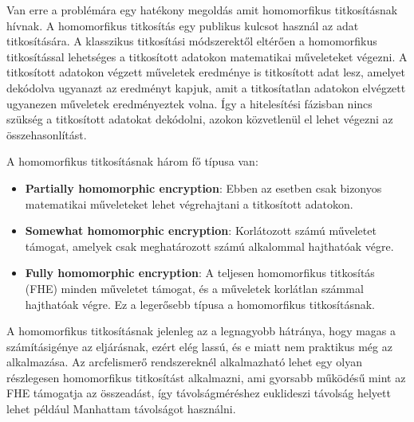Van erre a problémára egy hatékony megoldás amit homomorfikus titkosításnak hívnak. A homomorfikus titkosítás egy publikus kulcsot használ az adat titkosítására. A klasszikus titkosítási módszerektől eltérően a homomorfikus titkosítással lehetséges a titkosított adatokon matematikai műveleteket végezni. A titkosított adatokon végzett műveletek eredménye is titkosított adat lesz, amelyet dekódolva ugyanazt az eredményt kapjuk, amit a titkosítatlan adatokon elvégzett ugyanezen műveletek eredményeztek volna. Így a hitelesítési fázisban nincs szükség a titkosított adatokat dekódolni, azokon közvetlenül el lehet végezni az összehasonlítást. 

A homomorfikus titkosításnak három fő típusa van:

\begin{itemize}
	\item \textbf{Partially homomorphic encryption}: Ebben az esetben csak bizonyos matematikai műveleteket lehet végrehajtani a titkosított adatokon.
	\item \textbf{Somewhat homomorphic encryption}: Korlátozott számú műveletet támogat, amelyek csak meghatározott számú alkalommal hajthatóak végre.
	\item \textbf{Fully homomorphic encryption}: A teljesen homomorfikus titkosítás (FHE) minden műveletet támogat, és a műveletek korlátlan számmal hajthatóak végre. Ez a legerősebb típusa a homomorfikus titkosításnak. 
\end{itemize}

A homomorfikus titkosításnak jelenleg az a legnagyobb hátránya, hogy magas a számításigénye az eljárásnak, ezért elég lassú, és e miatt nem praktikus még az alkalmazása. Az arcfelismerő rendszereknél alkalmazható lehet egy olyan részlegesen homomorfikus titkosítást alkalmazni, ami gyorsabb működésű mint az FHE támogatja az összeadást, így távolságméréshez euklideszi távolság helyett lehet például Manhattam távolságot használni.



